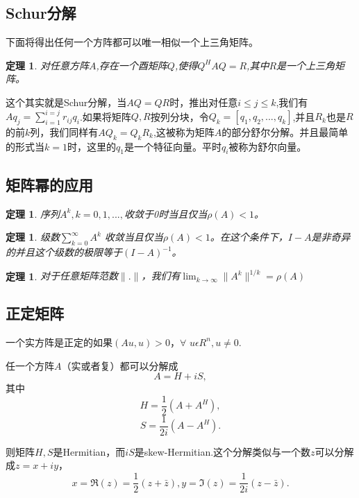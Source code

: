 \documentclass{article}
\begin{document}
\subsection{Schur分解}
下面将得出任何一个方阵都可以唯一相似一个上三角矩阵。

\newtheorem{thm}{定理}
\begin{thm}
对任意方阵$A$,存在一个酉矩阵$Q$,使得$Q^HAQ=R$,其中$R$是一个上三角矩阵。
\end{thm}

这个其实就是Schur分解，当$AQ=QR$时，推出对任意$i\leqslant j\leqslant k$,我们有$Aq_j=\sum_{i=1}^{i=j} r_{ij}q_i$.如果将矩阵$Q,R$按列分块，令$Q_k=[q_1,q_2,...,q_k]$,并且$R_k$也是$R$的前$k$列，我们同样有$AQ_k=Q_kR_k$,这被称为矩阵$A$的部分舒尔分解。并且最简单的形式当$k=1$时，这里的$q_1$是一个特征向量。平时$q_i$被称为舒尔向量。
\subsection{矩阵幂的应用}
\newtheorem{thm}{定理}
\begin{thm}
序列$A^k,k=0,1,...,$收敛于0时当且仅当$\rho (A)<1$。
\end{thm}

\newtheorem{thm}{定理}
\begin{thm}
级数$\sum_{k=0}^\infty A^k$ 收敛当且仅当$\rho (A)<1$。在这个条件下，$I-A$是非奇异的并且这个级数的极限等于$(I-A)^{-1}$。
\end{thm}

\newtheorem{thm}{定理}
\begin{thm}
对于任意矩阵范数$\parallel .\parallel$，我们有$\lim_{k \to \infty}\parallel A^k\parallel ^{1/k}=\rho (A)$
\end{thm}
















\subsection{正定矩阵}
一个实方阵是正定的如果$(Au,u)>0$，$\forall$ $ u  \epsilon  R^n,u\neq 0.$

任一个方阵$A$（实或者复）都可以分解成
$$A=H+iS,$$
其中
$$H=\frac{1}{2}(A+A^H),$$
$$S=\frac{1}{2i}(A-A^H).$$

则矩阵$H,S$是Hermitian，而$iS$是skew-Hermitian.这个分解类似与一个数$z$可以分解成$z=x+iy$，
$$x=\Re (z)=\frac{1}{2}(z+\bar{z}),y=\Im (z)=\frac{1}{2i}(z-\bar{z}).$$
\end{document}
